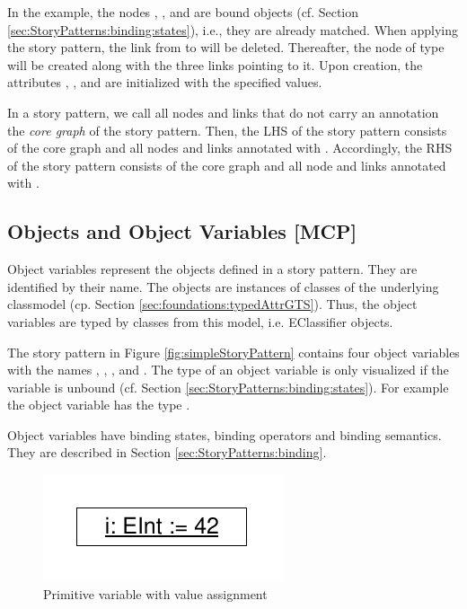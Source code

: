 In the example, the nodes , , and  are bound objects (cf. Section \ref{sec:StoryPatterns:binding:states}), i.e., they are already matched. When applying the story pattern, the link from  to  will be deleted. Thereafter, the node  of type  will be created along with the three links pointing to it. Upon creation, the attributes , , and  are initialized with the specified values.

In a story pattern, we call all nodes and links that do not carry an annotation the \emph{core graph} of the story pattern. Then, the LHS of the story pattern consists of the core graph and all nodes and links annotated with \destroy. Accordingly, the RHS of the story pattern consists of the core graph and all node and links annotated with \create.

\subsection{Objects and Object Variables [MCP]}
\label{sec:StoryPatterns:objects}

Object variables represent the objects defined in a story pattern.
They are identified by their name.
The objects are instances of classes of the underlying classmodel (cp. Section \ref{sec:foundations:typedAttrGTS}).
Thus, the object variables are typed by classes from this model, i.e.
EClassifier objects.

The story pattern in Figure \ref{fig:simpleStoryPattern} contains four
object variables with the names , , , and
. 
The type of an object variable is only visualized if the
variable is unbound (cf. Section \ref{sec:StoryPatterns:binding:states}). For
example the object variable  has the type .

Object variables have binding states, binding operators and binding semantics.
They are described in Section  \ref{sec:StoryPatterns:binding}.


\begin{figure}[htbp]
  \centering
  \includegraphics[scale=0.6]{figures/PrimitiveVariable}
  \caption{Primitive variable with value assignment}
  \label{fig:primitiveVariable}
\end{figure}


